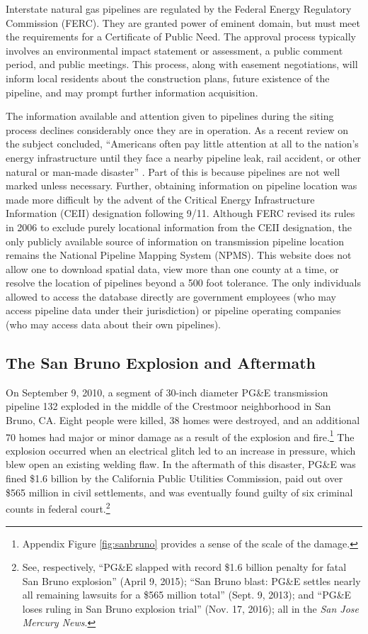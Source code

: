 \documentclass[12pt]{article}
\begin{document}
Interstate natural gas pipelines are regulated by the Federal Energy
Regulatory Commission (FERC). They are granted power of eminent domain,
but must meet the requirements for a Certificate of Public Need. The
approval process typically involves an environmental impact statement
or assessment, a public comment period, and public meetings. This
process, along with easement negotiations, will inform local residents
about the construction plans, future existence of the pipeline, and
may prompt further information acquisition. 

The information available and attention given to pipelines during
the siting process declines considerably once they are in operation.
As a recent review on the subject concluded, ``Americans often pay
little attention at all to the nation's energy infrastructure until
they face a nearby pipeline leak, rail accident, or other natural
or man-made disaster'' \citep{klass_transporting_2014}. Part of
this is because pipelines are not well marked unless necessary. Further,
obtaining information on pipeline location was made more difficult
by the advent of the Critical Energy Infrastructure Information (CEII)
designation following 9/11. Although FERC revised its rules in 2006
to exclude purely locational information from the CEII designation,
the only publicly available source of information on transmission
pipeline location remains the National Pipeline Mapping System (NPMS).
This website does not allow one to download spatial data, view more
than one county at a time, or resolve the location of pipelines beyond
a 500 foot tolerance. The only individuals allowed to access the database
directly are government employees (who may access pipeline data under
their jurisdiction) or pipeline operating companies (who may access
data about their own pipelines).

\subsection{The San Bruno Explosion and Aftermath}

On September 9, 2010, a segment of 30-inch diameter PG\&E transmission
pipeline 132 exploded in the middle of the Crestmoor neighborhood
in San Bruno, CA. Eight people were killed, 38 homes were destroyed,
and an additional 70 homes had major or minor damage as a result of
the explosion and fire.\footnote{ Appendix Figure \ref{fig:sanbruno} provides a sense of the scale
of the damage.} The explosion occurred when an electrical glitch led to an increase
in pressure, which blew open an existing welding flaw. In the aftermath
of this disaster, PG\&E was fined \$1.6 billion by the California
Public Utilities Commission, paid out over \$565 million in civil
settlements, and was eventually found guilty of six criminal counts
in federal court.\footnote{See, respectively, ``PG\&E slapped with record \$1.6 billion penalty
for fatal San Bruno explosion'' (April 9, 2015); ``San Bruno blast:
PG\&E settles nearly all remaining lawsuits for a \$565 million total''
(Sept. 9, 2013); and ``PG\&E loses ruling in San Bruno explosion
trial'' (Nov. 17, 2016); all in the \emph{San Jose Mercury News}.}
\end{document}
